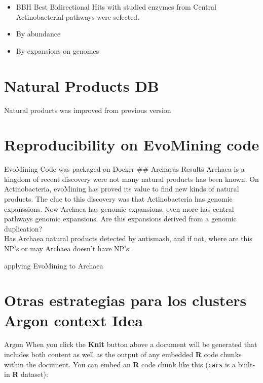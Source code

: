 \documentclass[12pt,twoside]{reedthesis}
\begin{document}
  \begin{itemize}
  \item
    BBH Best Bidirectional Hits with studied enzymes from Central
    Actinobacterial pathways were selected.
  \item
    By abundance
  \item
    By expansions on genomes
  \end{itemize}
  
  \section{Natural Products DB}\label{natural-products-db}
  
  Natural products was improved from previous version
  
  \section{Reproducibility on EvoMining
  code}\label{reproducibility-on-evomining-code}
  
  EvoMining Code was packaged on Docker \#\# Archaeas Results Archaea is a
  kingdom of recent discovery were not many natural products has been
  known. On Actinobacteria, evoMining has proved its value to find new
  kinds of natural products. The clue to this discovery was that
  Actinobacteria has genomic expanssions. Now Archaea has genomic
  expansions, even more has central pathways genomic expansions. Are this
  expansions derived from a genomic duplication?\\
  Has Archaea natural products detected by antismash, and if not, where
  are this NP's or may Archaea doesn't have NP's.
  
  applying EvoMining to Archaea
  
  \section{Otras estrategias para los clusters Argon context
  Idea}\label{otras-estrategias-para-los-clusters-argon-context-idea}
  
  Argon When you click the \textbf{Knit} button above a document will be
  generated that includes both content as well as the output of any
  embedded \textbf{R} code chunks within the document. You can embed an
  \textbf{R} code chunk like this (\texttt{cars} is a built-in \textbf{R}
  dataset):
  
  \begin{Shaded}
  \begin{Highlighting}[]
  \end{Highlighting}
  \end{Shaded}
  
\end{document}
